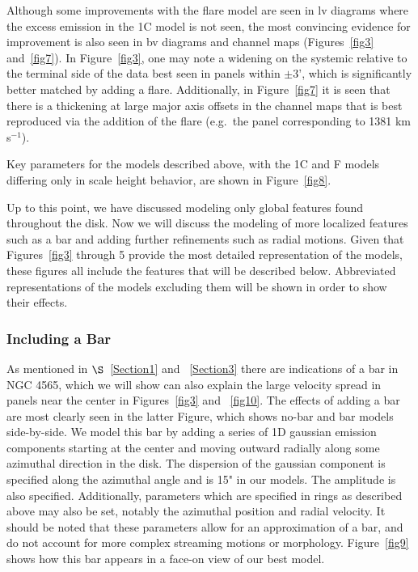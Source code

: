 \documentclass{emulateapj}
\begin{document}
\par
     Although some improvements with the flare model are seen in lv diagrams where the excess emission in the 1C model is not seen, the most convincing evidence for improvement is also seen in bv diagrams and channel maps (Figures~\ref{fig3} and~\ref{fig7}).  In Figure~\ref{fig3}, one may note a widening on the systemic relative to the terminal side of the data best seen in panels within $\pm$3', which is significantly better matched by adding a flare.  Additionally, in Figure~\ref{fig7} it is seen that there is a thickening at large major axis offsets in the channel maps that is best reproduced via the addition of the flare (e.g.\ the panel corresponding to 1381 km s$^{-1}$). 

\par
    Key parameters for the models described above, with the 1C and F models differing only in scale height behavior, are shown in Figure~\ref{fig8}.

\par
    Up to this point, we have discussed modeling only global features found throughout the disk.  Now we will discuss the modeling of more localized features such as a bar and adding further refinements such as radial motions.  Given that Figures~\ref{fig3} through 5 provide the most detailed representation of the models, these figures all include the features that will be described below. Abbreviated representations of the models excluding them will be shown in order to show their effects.   


\subsubsection{Including a Bar} \label{Section4.1.3}

\par
    As mentioned in $\S$~\ref{Section1} and ~\ref{Section3} there are indications of a bar in NGC 4565, which we will show can also explain the large velocity spread in panels near the center in Figures~\ref{fig3} and ~\ref{fig10}.  The effects of adding a bar are most clearly seen in the latter Figure, which shows no-bar and bar models side-by-side.  We model this bar by adding a series of 1D gaussian emission components starting at the center and moving outward radially along some azimuthal direction in the disk.  The dispersion of the gaussian component is specified along the azimuthal angle and is 15" in our models.  The amplitude is also specified.  Additionally, parameters which are specified in rings as described above may also be set, notably the azimuthal position and radial velocity.  It should be noted that these parameters allow for an approximation of a bar, and do not account for more complex streaming motions or morphology.  Figure~\ref{fig9} shows how this bar appears in a face-on view of our best model. 
\end{document}
